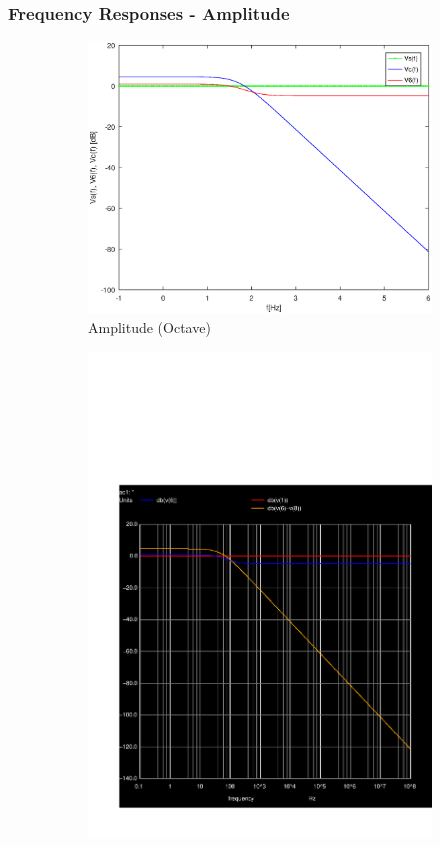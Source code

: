 \subsubsection{Frequency Responses - Amplitude}

\begin{figure}[H] 
\centering
\begin{subfigure}{0.5\textwidth}
\includegraphics[width=\textwidth]{Amplitude.eps}
\caption{Amplitude (Octave)}
\label{fig:first}
\end{subfigure}
\begin{subfigure}{0.42\textwidth}
\includegraphics[width=\textwidth]{sim5_db.pdf}

\end{subfigure}
\end{figure}
